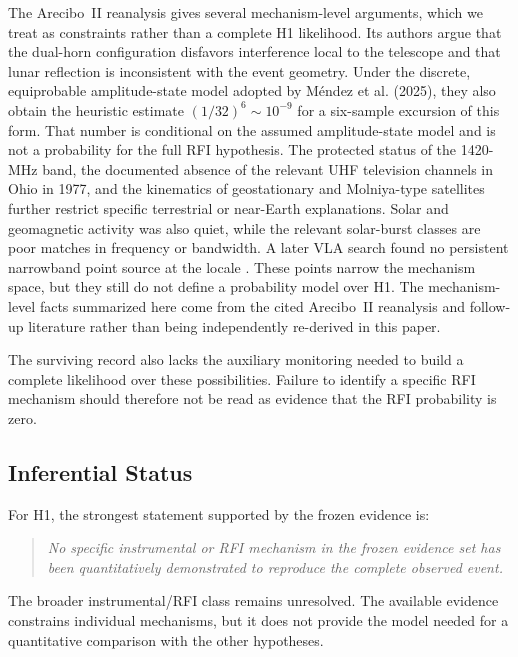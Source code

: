 \documentclass[crop]{CSL}
\begin{document}
The Arecibo~II reanalysis \citep{mendez2025} gives several mechanism-level arguments, which we treat as constraints rather than a complete H1 likelihood. Its authors argue that the dual-horn configuration disfavors interference local to the telescope and that lunar reflection is inconsistent with the event geometry. Under the discrete, equiprobable amplitude-state model adopted by M\'endez et al. (2025), they also obtain the heuristic estimate $(1/32)^6\sim10^{-9}$ for a six-sample excursion of this form. That number is conditional on the assumed amplitude-state model and is not a probability for the full RFI hypothesis. The protected status of the 1420-MHz band, the documented absence of the relevant UHF television channels in Ohio in 1977, and the kinematics of geostationary and Molniya-type satellites further restrict specific terrestrial or near-Earth explanations. Solar and geomagnetic activity was also quiet, while the relevant solar-burst classes are poor matches in frequency or bandwidth. A later VLA search found no persistent narrowband point source at the locale \citep{gray2001}. These points narrow the mechanism space, but they still do not define a probability model over H1. The mechanism-level facts summarized here come from the cited Arecibo~II reanalysis and follow-up literature rather than being independently re-derived in this paper.

The surviving record also lacks the auxiliary monitoring needed to build a complete likelihood over these possibilities. Failure to identify a specific RFI mechanism should therefore not be read as evidence that the RFI probability is zero.

\subsection{Inferential Status}

For H1, the strongest statement supported by the frozen evidence is:
\begin{quote}
\emph{No specific instrumental or RFI mechanism in the frozen evidence set has been quantitatively demonstrated to reproduce the complete observed event.}
\end{quote}

The broader instrumental/RFI class remains unresolved. The available evidence constrains individual mechanisms, but it does not provide the model needed for a quantitative comparison with the other hypotheses.

\end{document}
